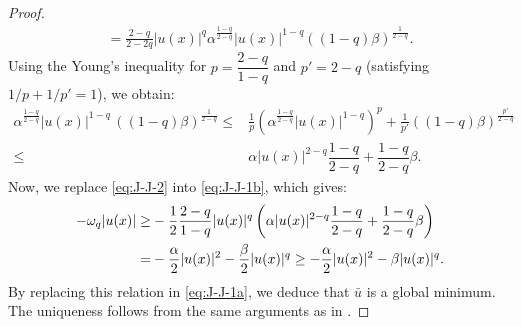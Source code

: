 \begin{proof}
\begin{align}
				   = \frac{2-q}{2-2q} |u(x)|^q  \alpha^{\frac{1-q}{2-q}} |u(x)|^{1-q}((1-q)\beta)^{\frac{1}{2-q}}.	\label{eq:J-J-1b}
\end{align}
Using the Young's inequality for $p=\dfrac{2-q}{1-q}$ and $p'=2-q$ (satisfying $1/p+1/p' =1$), we obtain:
\begin{align}
	\alpha^{\frac{1-q}{2-q}} |u(x)|^{1-q}\, ((1-q)\beta)^{\frac{1}{2-q}} \leq & \frac{1}{p}(\alpha^{\frac{1-q}{2-q}} |u(x)|^{1-q})^p + \frac{1}{p'}((1-q)\beta)^{\frac{p'}{2-q}}\nonumber\\
	\leq &\alpha |u(x)|^{2-q} \dfrac{1-q}{2-q}+\dfrac{1-q}{2-q}\beta \label{eq:J-J-2}.
\end{align}
Now, we replace \eqref{eq:J-J-2} into \eqref{eq:J-J-1b}, which gives:
%
\begin{align}
	-\omega_q|u(x)| \geq &  -\frac{1}{2}\frac{2-q}{1-q} |u(x)|^q  \left(	\alpha |u(x)|^{2-q} \dfrac{1-q}{2-q}+\dfrac{1-q}{2-q}\beta\right)\nonumber\\
	=&-\dfrac{\alpha}{2} |u(x)|^{2}-\frac{\beta}{2}|u(x)|^{q} \ge -\dfrac{\alpha}{2} |u(x)|^{2}- {\beta}|u(x)|^{q}.
\end{align}
By replacing this relation in \eqref{eq:J-J-1a}, we deduce that $\bar u$ is a global minimum. The uniqueness follows from the same arguments as in \cite{ito-kunisch2014}.
\end{proof}

